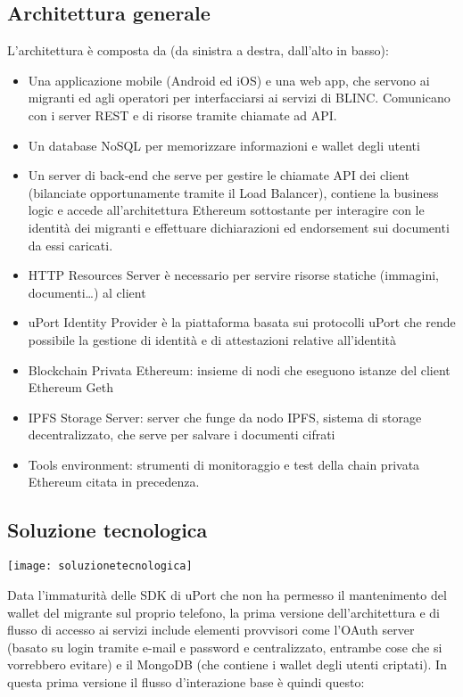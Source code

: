 \subsection{Architettura generale}
L’architettura è composta da (da sinistra a destra, dall’alto in basso):
\begin{itemize}
    \item Una applicazione mobile (Android ed iOS) e una web app, che servono ai migranti ed agli operatori per interfacciarsi ai servizi di BLINC.
    Comunicano con i server REST e di risorse tramite chiamate ad API.
    \item Un database NoSQL per memorizzare informazioni e wallet degli utenti
    \item Un server di back-end che serve per gestire le chiamate API dei client (bilanciate opportunamente tramite il Load Balancer), 
    contiene la business logic e accede all’architettura Ethereum sottostante per interagire con le identità
    dei migranti e effettuare dichiarazioni ed endorsement sui documenti da essi caricati.
    \item HTTP Resources Server è necessario per servire risorse statiche (immagini, documenti…) al client
    \item uPort Identity Provider è la piattaforma basata sui protocolli uPort che rende possibile la gestione di identità e
    di attestazioni relative all’identità
    \item Blockchain Privata Ethereum: insieme di nodi che eseguono istanze del client Ethereum Geth
    \item IPFS Storage Server: server che funge da nodo IPFS, sistema di storage decentralizzato, che serve per salvare i documenti cifrati
    \item Tools environment: strumenti di monitoraggio e test della chain privata Ethereum citata in precedenza.
\end{itemize}

\subsection{Soluzione tecnologica}

\texttt{[image: soluzionetecnologica]}

Data l’immaturità delle SDK di uPort che non ha permesso il mantenimento del wallet del migrante sul proprio telefono, la prima versione 
dell’architettura e di flusso di accesso ai servizi include elementi provvisori come l’OAuth server (basato su login tramite e-mail e password e centralizzato, 
entrambe cose che si vorrebbero evitare) e il MongoDB (che contiene i wallet degli utenti criptati).	
In questa prima versione il flusso d’interazione base è quindi questo:

